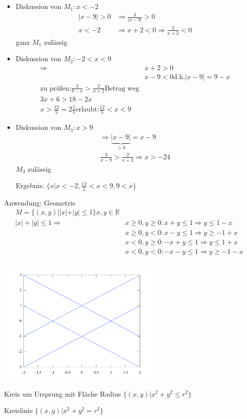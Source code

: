 \begin{itemize}
 \item Diskussion von $M_1: x < -2$
\begin{align*}
|x-9|>0 &\Rightarrow \frac{3}{|x-9|} > 0 \\
x<-2 &\Rightarrow x+2<0 \Rightarrow \frac{2}{x+2}<0
\end{align*}
ganz $M_1$ zulässig
 \item Diskussion von $M_2: -2<x<9$
\begin{align*}
\Rightarrow &x+2 > 0 \\
&x-9<0 \textrm{d.h.} |x-9|=9-x \\
\textrm{zu prüfen:}
\frac{3}{9-x} > \frac{2}{x+2} \textrm{Betrag weg} \\
3x+6 > 18-2x \\
x > \frac{12}{5} = 2 \frac{2}{5}
\textrm{erlaubt:} \frac{12}{5}<x<9
\end{align*}
 \item Diskussion von $M_3: x>9$
\begin{align*}
 \Rightarrow \underbrace{|x-9|}_{>0} = x-9 \\
\frac{3}{x-9} > \frac{2}{x+2}
\Rightarrow x>-24
\end{align*}
$M_3$ zulässig

Ergebnis: $\{x|x<-2, \frac{12}{5}<x<9, 9<x\}$
\end{itemize}

\begin{minipage}{1\textwidth}
Anwendung: Geometrie
\begin{align*}
M = \{(x,y)| |x|+|y| \leq 1 \} x,y \in \mathbb{R} \\
|x|+|y| \leq 1 \Rightarrow &x \geq 0, y \geq 0: x+y \leq 1 \Rightarrow y \leq 1-x \\
	&x \geq 0, y < 0: x-y \leq 1 \Rightarrow y \geq -1+x \\
	&x < 0, y \geq 0: -x+y \leq 1 \Rightarrow y \leq 1+x \\
	&x < 0, y < 0: -x-y \leq 1 \Rightarrow y \geq -1-x \\
\end{align*}

\begin{center}
\includegraphics[width=0.6\textwidth]{geo_betraege.pdf}
\end{center}
\end{minipage}
  
\medskip Kreis um Ursprung mit Fläche
Radius $\{(x,y)| x^2+y^2\leq r^2 \}$

Kreislinie $\{(x,y)| x^2+y^2 = r^2 \}$

